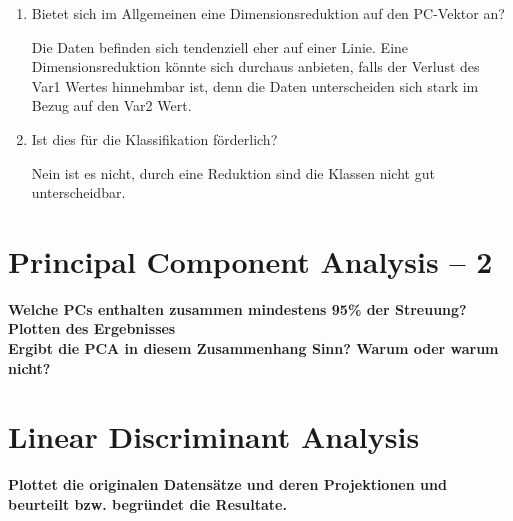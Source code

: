 \documentclass[a4paper]{scrartcl}
\begin{document}
\begin{enumerate}[(a)]
	\begin{enumerate}[1.]
		\item Bietet sich im Allgemeinen eine Dimensionsreduktion auf den PC-Vektor an?
		
		Die Daten befinden sich tendenziell eher auf einer Linie. Eine Dimensionsreduktion könnte sich durchaus anbieten, falls der Verlust des Var1 Wertes hinnehmbar ist, denn die Daten unterscheiden sich stark im Bezug auf den Var2 Wert.
		
		\item Ist dies für die Klassifikation förderlich?
		
		Nein ist es nicht, durch eine Reduktion sind die Klassen nicht gut unterscheidbar.
		
	\end{enumerate}
	
\end{enumerate}


\section{Principal Component Analysis – 2}

\textbf{Welche PCs enthalten zusammen mindestens  95\% der Streuung?}\\


\textbf{Plotten des Ergebnisses}\\


\textbf{Ergibt die PCA in diesem Zusammenhang Sinn? Warum oder warum nicht?}\\
   
\section{Linear Discriminant Analysis}

\textbf{Plottet die originalen Datensätze und deren Projektionen und beurteilt bzw. begründet die Resultate.}

\end{document}
